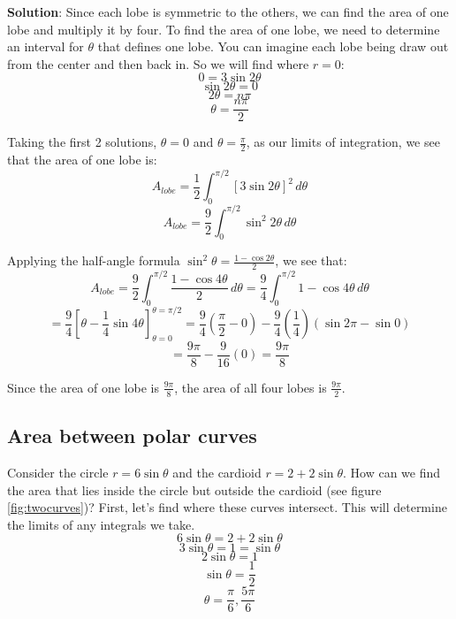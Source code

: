 \textbf{Solution}: Since each lobe is symmetric to the others, we can find the 
area of one lobe and multiply it by four. To find the area of one lobe, we 
need to determine an interval for $\theta$ that defines one lobe. You can 
imagine each lobe being draw out from the center and then back in. So we will 
find where $r = 0$:
$$0 = 3\sin{2\theta}$$
$$\sin{2\theta} = 0$$
$$2\theta = n\pi$$
$$\theta = \frac{n\pi}{2}$$

Taking the first 2 solutions, $\theta = 0$ and $\theta = \frac{\pi}{2}$, as our 
limits of integration, we see that the area of one lobe is:
$$A_{lobe} = \frac{1}{2} \int_0^{\pi/2} \left[3 \sin{2 \theta} \right]^2\,d
\theta$$
$$A_{lobe} = \frac{9}{2} \int_0^{\pi/2} \sin^2{2\theta}\,d\theta$$

Applying the half-angle formula $\sin^2{\theta} = \frac{1 - \cos{2\theta}}{2}$, 
we see that:
$$A_{lobe} = \frac{9}{2} \int_0^{\pi/2} \frac{1 - \cos{4\theta}}{2}\,d\theta = 
\frac{9}{4} \int_0^{\pi / 2} 1 - \cos{4\theta} \, d\theta$$
$$= \frac{9}{4} \left[ \theta - \frac{1}{4} \sin{4\theta} \right]_{\theta = 0}^
{\theta = \pi / 2} = \frac{9}{4} \left( \frac{\pi}{2} - 0 \right) - \frac{9}{4}
\left( \frac{1}{4} \right) \left( \sin{2\pi} - \sin{0} \right)$$
$$= \frac{9\pi}{8} - \frac{9}{16} \left( 0 \right) = \frac{9\pi}{8}$$

Since the area of one lobe is $\frac{9\pi}{8}$, the area of all four lobes is 
$\frac{9\pi}{2}$.

\subsection{Area between polar curves}
Consider the circle $r = 6\sin{\theta}$ and the cardioid $r = 2 + 2\sin{\theta}
$. How can we find the area that lies inside the circle but outside the 
cardioid (see figure \ref{fig:twocurves})? First, let's find where these curves
intersect. This will determine the limits of any integrals we take.
$$6\sin{\theta} = 2 + 2\sin{\theta}$$
$$3\sin{\theta} = 1 = \sin{\theta}$$
$$2\sin{\theta} = 1$$
$$\sin{\theta} = \frac{1}{2}$$
$$\theta = \frac{\pi}{6}, \frac{5\pi}{6}$$

